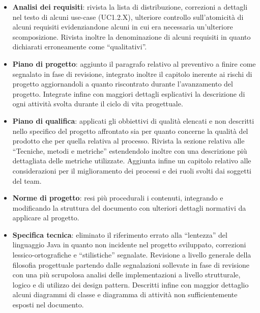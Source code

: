 \begin{itemize}
\item \textbf{Analisi dei requisiti}: rivista la lista di distribuzione, correzioni a dettagli nel testo di alcuni use-case (UC1.2.X), ulteriore controllo sull'atomicità di alcuni requisiti evidenziandone alcuni in cui era necessaria un'ulteriore scomposizione. Rivista inoltre la denominazione di alcuni requisiti in quanto dichiarati erroneamente come ``qualitativi''.

\item \textbf{Piano di progetto}: aggiunto il paragrafo relativo al preventivo a finire come segnalato in fase di revisione, integrato inoltre il capitolo inerente ai rischi di progetto aggiornandoli a quanto riscontrato durante l'avanzamento del progetto. Integrate infine con maggiori dettagli esplicativi la descrizione di ogni attività svolta durante il ciclo di vita progettuale.

\item \textbf{Piano di qualifica}: applicati gli obbiettivi di qualità elencati e non descritti nello specifico del progetto affrontato sia per quanto concerne la qualità del prodotto che per quella relativa al processo. Rivista la sezione relativa alle ``Tecniche, metodi e metriche'' estendendolo inoltre con una descrizione più dettagliata delle metriche utilizzate. Aggiunta infine un capitolo relativo alle considerazioni per il miglioramento dei processi e dei ruoli svolti dai soggetti del team.

\item \textbf{Norme di progetto}: resi più procedurali i contenuti, integrando e modificando la struttura del documento con ulteriori dettagli normativi da applicare al progetto.

\item \textbf{Specifica tecnica}: eliminato il riferimento errato alla ``lentezza'' del linguaggio Java in quanto non incidente nel progetto sviluppato, correzioni lessico-ortografiche e ``stilistiche'' segnalate. Revisione a livello generale della filosofia progettuale partendo dalle segnalazioni sollevate in fase di revisione con una più scrupolosa analisi delle implementazioni a livello strutturale, logico e di utilizzo dei design pattern. Descritti infine con maggior dettaglio alcuni diagrammi di classe e diagramma di attività non sufficientemente esposti nel documento.
\end{itemize}

